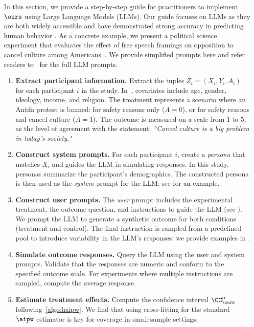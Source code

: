 In this section, we provide a step-by-step guide for practitioners to implement $\ours$ using Large Language Models (LLMs). Our guide focuses on LLMs as they are both widely accessible and have demonstrated strong accuracy in predicting human behavior \citep{grossmann2023ai}. As a concrete example, we present a political science experiment that evaluates the effect of free speech framings on opposition to cancel culture among Americans~\citep{fahey2023principled}. We provide simplified prompts here and refer readers to~ for the full LLM prompts. 




\begin{enumerate}
\item \textbf{Extract participant information.} Extract the tuples $Z_i = (X_i, Y_i, A_i)$ for each participant $i$ in the study. 
 In~\citet{fahey2023principled}, covariates include age, gender, ideology, income, and religion. The treatment represents a scenario where an Antifa protest is banned:
for safety reasons only ($A = 0$), or
 for safety reasons and cancel culture ($A = 1$).
The outcome is measured on a scale from 1 to 5, as the level of agreement with the statement: \emph{``Cancel culture is a big problem in today’s society."}



\item \textbf{Construct system prompts.} For each participant $i$, create a \emph{persona} that matches $X_i$ and guides the LLM in simulating  responses. In this study, personas summarize the participant's demographics. The constructed persona is then used as the \emph{system} prompt for the LLM; see  for an example.








\item \textbf{Construct user prompts.} The \emph{user} prompt includes the experimental treatment, the outcome question, and instructions to guide the LLM (see ). We prompt the LLM to generate a synthetic outcome for both conditions (treatment and control). The final instruction is sampled from a predefined pool to introduce variability in the LLM's responses; we provide examples in .




\item \textbf{Simulate 
 outcome responses.} Query the LLM using the user and system prompts. Validate that the responses are numeric and conform to the specified outcome scale. For experiments where multiple instructions are sampled, compute the average response.


\item \textbf{Estimate treatment effects.} Compute the confidence interval $\CC_{\ours}^\alpha$ following~\cref{algo:haipw}. We find that using cross-fitting for the standard $\aipw$ estimator is key for coverage in small-sample settings.


    
\end{enumerate}


